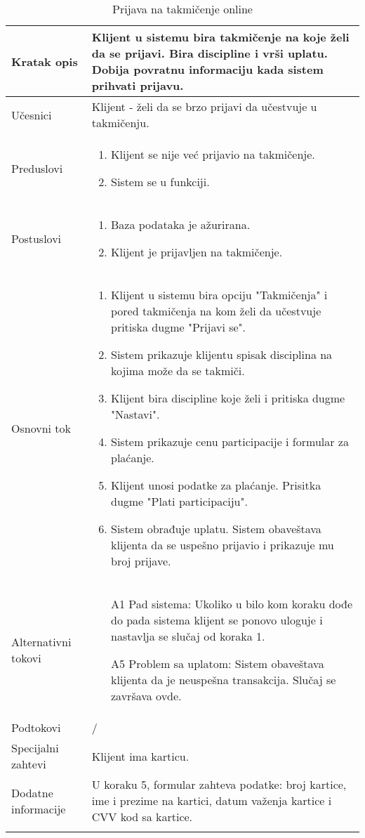 \documentclass[../../main.tex]{subfiles}
\begin{document}
\begin{longtable}{| p{} | p{} |} 
\hline
    Kratak opis & Klijent u sistemu bira takmičenje na koje želi da se prijavi. Bira discipline i vrši uplatu. Dobija povratnu informaciju kada sistem prihvati prijavu. \\ 
\hline    
    Učesnici & Klijent - želi da se brzo prijavi da učestvuje u takmičenju.\\
\hline
   Preduslovi & \begin{enumerate}
       \item Klijent se nije već prijavio na takmičenje.
       \item Sistem se u funkciji.
   \end{enumerate}\\
\hline  
    Postuslovi & \begin{enumerate}
        \item Baza podataka je ažurirana.
        \item Klijent je prijavljen na takmičenje.
    \end{enumerate}\\
\hline
    Osnovni tok & \begin{enumerate}
        \item Klijent u sistemu bira opciju "Takmičenja" i pored takmičenja na kom želi da učestvuje pritiska dugme "Prijavi se".
        \item Sistem prikazuje klijentu spisak disciplina na kojima može da se takmiči.
        \item Klijent bira discipline koje želi i pritiska dugme "Nastavi".
        \item Sistem prikazuje cenu participacije i formular za plaćanje.
        \item Klijent unosi podatke za plaćanje. Prisitka dugme "Plati participaciju".
        \item Sistem obrađuje uplatu. Sistem obaveštava klijenta da se uspešno prijavio i prikazuje mu broj prijave.
    \end{enumerate}\\
\hline
    Alternativni tokovi & \begin{itemize}
        \item[A1] Pad sistema: Ukoliko u bilo kom koraku dođe do pada sistema klijent se ponovo uloguje i nastavlja se slučaj od koraka 1.
        \item[A5] Problem sa uplatom: Sistem obaveštava klijenta da je neuspešna transakcija. Slučaj se završava ovde. 
    \end{itemize}\\
\hline
    Podtokovi & /\\
\hline
    Specijalni zahtevi & Klijent ima karticu.\\
\hline
    Dodatne informacije & U koraku 5, formular zahteva podatke: broj kartice, ime i prezime na kartici, datum važenja kartice i CVV kod sa kartice.\\
\hline
\caption{Prijava na takmičenje online} %
\end{longtable}
\end{document}
